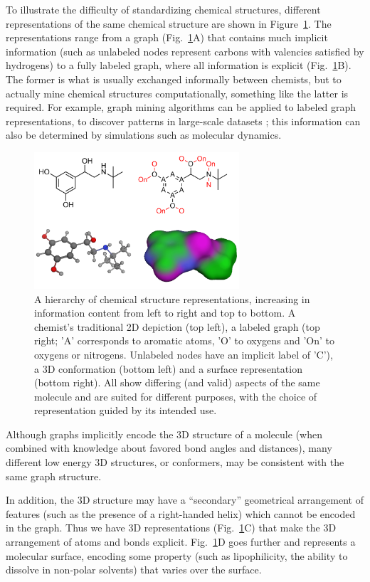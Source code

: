 \documentclass{sig-alternate}
\begin{document}
To illustrate the difficulty of standardizing chemical structures,
different representations of the same chemical structure are shown in
Figure~\ref{figure:chemical-structures}. The representations range
from a graph (Fig.~\ref{figure:chemical-structures}A) that contains
much implicit information (such as unlabeled nodes represent carbons
with valencies satisfied by hydrogens) to a fully labeled graph,
where all information is explicit
(Fig.~\ref{figure:chemical-structures}B). The former is what is
usually exchanged informally between chemists, but to actually mine
chemical structures computationally, something like the latter is
required.  For example, graph mining algorithms can be applied to
labeled graph representations, to discover patterns in large-scale
datasets \cite{horst2009}; this information can also be determined by simulations such as molecular dynamics.

\begin{figure}
\centering
\includegraphics[height=2in]{chemical-structures.png}
\caption{A hierarchy of chemical structure representations, increasing
  in information content from left to right and top to bottom. A
  chemist's traditional 2D depiction (top left), a labeled graph (top
  right; 'A' corresponds to aromatic atoms, 'O' to oxygens and 'On' to
  oxygens or nitrogens. Unlabeled nodes have an implicit label of 'C'), a 3D
  conformation (bottom left) and a surface representation (bottom right). All show differing
  (and valid) aspects of the same molecule and are suited for
  different purposes, with the choice of representation guided by its
  intended use.}
\label{figure:chemical-structures}
\end{figure}

Although graphs implicitly encode the 3D structure of a molecule (when
combined with knowledge about favored bond angles and distances), many
different low energy 3D structures, or conformers, may be consistent
with the same graph structure. 

In addition, the 3D structure may have
a ``secondary'' geometrical arrangement of features (such as the
presence of a right-handed helix) which cannot be encoded in the
graph. Thus we have 3D representations
(Fig.~\ref{figure:chemical-structures}C) that make the 3D arrangement
of atoms and bonds explicit. Fig.~\ref{figure:chemical-structures}D
goes further and represents a molecular surface, encoding some
property (such as lipophilicity, the ability to dissolve in non-polar
solvents) that varies over the surface.
\end{document}
